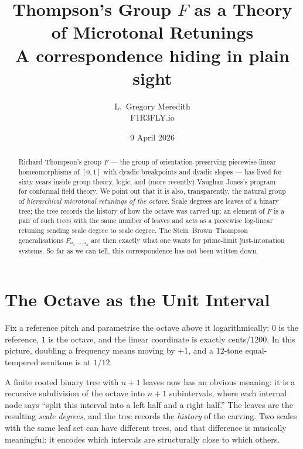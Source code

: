 \documentclass[11pt]{article}
\title{\color{f1rnavy}\textbf{Thompson's Group $F$ as a Theory of Microtonal Retunings}\\[0.3em]
\large\color{f1rsage} A correspondence hiding in plain sight}
\author{\color{f1rnavy}L.~Gregory Meredith\\\small F1R3FLY.io}
\date{\color{f1rnavy}9 April 2026}
\begin{document}
\maketitle

\begin{abstract}
\noindent Richard Thompson's group $F$ --- the group of orientation-preserving piecewise-linear homeomorphisms of $[0,1]$ with dyadic breakpoints and dyadic slopes --- has lived for sixty years inside group theory, logic, and (more recently) Vaughan Jones's program for conformal field theory. We point out that it is also, transparently, the natural group of \emph{hierarchical microtonal retunings of the octave}. Scale degrees are leaves of a binary tree; the tree records the history of how the octave was carved up; an element of $F$ is a pair of such trees with the same number of leaves and acts as a piecewise log-linear retuning sending scale degree to scale degree. The Stein--Brown--Thompson generalisations $F_{n_1,\ldots,n_k}$ are then exactly what one wants for prime-limit just-intonation systems. So far as we can tell, this correspondence has not been written down.
\end{abstract}

\section{The Octave as the Unit Interval}

Fix a reference pitch and parametrise the octave above it logarithmically: $0$ is the reference, $1$ is the octave, and the linear coordinate is exactly cents/$1200$. In this picture, doubling a frequency means moving by $+1$, and a $12$-tone equal-tempered semitone is at $1/12$.

A finite rooted binary tree with $n+1$ leaves now has an obvious meaning: it is a recursive subdivision of the octave into $n+1$ subintervals, where each internal node says ``split this interval into a left half and a right half.'' The leaves are the resulting \emph{scale degrees}, and the tree records the \emph{history} of the carving. Two scales with the same leaf set can have different trees, and that difference is musically meaningful: it encodes which intervals are structurally close to which others.
\end{document}
